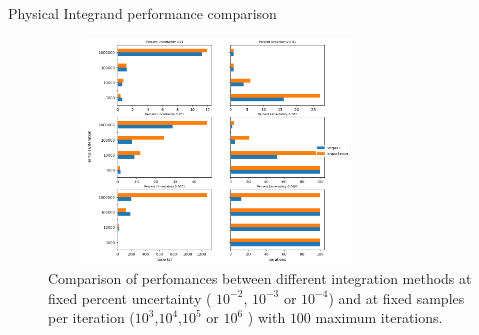 \documentclass[t,handout,professionalfonts]{beamer}
\begin{document}
\begin{frame}{Physical Integrand performance comparison}
	\tiny
	\vspace{-0.4cm}
	\begin{figure}
		\includegraphics[height=6cm,width=9cm]{../performance_plots/dy_aa_no_stratified.png}
		\caption{Comparison of perfomances between different integration methods at fixed percent uncertainty ( $10^{-2}$, $10^{-3}$ or $10^{-4}$) and at fixed samples per iteration ($10^3$,$10^4$,$10^5$ or $10^6$ ) with $100$ maximum iterations.}
	\end{figure}
	
\end{frame}
\end{document}
